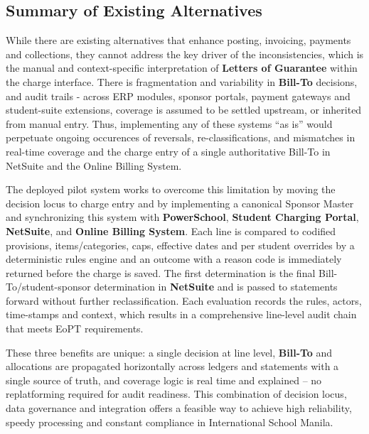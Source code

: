 \subsection{Summary of Existing Alternatives}

While there are existing alternatives that enhance posting, invoicing, payments and collections, they cannot address the key driver of the inconsistencies, which is the manual and context-specific interpretation of \textbf{Letters of Guarantee} within the charge interface. There is fragmentation and variability in \textbf{Bill-To} decisions, and audit trails - across ERP modules, sponsor portals, payment gateways and student-suite extensions, coverage is assumed to be settled upstream, or inherited from manual entry. Thus, implementing any of these systems “as is” would perpetuate ongoing occurences of reversals, re-classifications, and mismatches in real-time coverage and the charge entry of a single authoritative Bill-To in NetSuite and the Online Billing System.

The deployed pilot system works to overcome this limitation by moving the decision locus to charge entry and by implementing a canonical Sponsor Master and synchronizing this system with \textbf{PowerSchool}, \textbf{Student Charging Portal}, \textbf{NetSuite}, and \textbf{Online Billing System}. Each line is compared to codified provisions, items/categories, caps, effective dates and per student overrides by a deterministic rules engine and an outcome with a reason code is immediately returned before the charge is saved. The first determination is the final Bill-To/student-sponsor determination in \textbf{NetSuite} and is passed to statements forward without further reclassification. Each evaluation records the rules, actors, time-stamps and context, which results in a comprehensive line-level audit chain that meets EoPT requirements. 

These three benefits are unique: a single decision at line level, \textbf{Bill-To} and allocations are propagated horizontally across ledgers and statements with a single source of truth, and coverage logic is real time and explained – no replatforming required for audit readiness. This combination of decision locus, data governance and integration offers a feasible way to achieve high reliability, speedy processing and constant compliance in International School Manila.